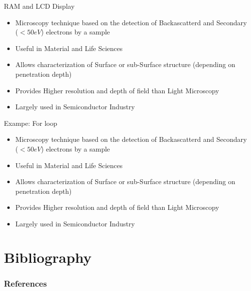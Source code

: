 \documentclass{beamer}
\begin{document}
  \begin{frame}{RAM and LCD Display}
    \begin{itemize}
        \item Microscopy technique based on the detection of Backascatterd and Secondary ($<50eV$) electrons by a sample
        \item Useful in Material and Life Sciences
        \item Allows characterization of Surface or sub-Surface structure (depending on penetration depth)
        \item Provides Higher resolution and depth of field than Light Microscopy 
        \item Largely used in Semiconductor Industry
    \end{itemize}
  \end{frame}

  \begin{frame}{Exampe: For loop}
    \begin{itemize}
        \item Microscopy technique based on the detection of Backascatterd and Secondary ($<50eV$) electrons by a sample
        \item Useful in Material and Life Sciences
        \item Allows characterization of Surface or sub-Surface structure (depending on penetration depth)
        \item Provides Higher resolution and depth of field than Light Microscopy 
        \item Largely used in Semiconductor Industry
    \end{itemize}
  \end{frame}

  

\section{Bibliography}

     

     \begin{frame}[allowframebreaks]
      \frametitle{References}
      
      
    \end{frame}

  
\end{document}
